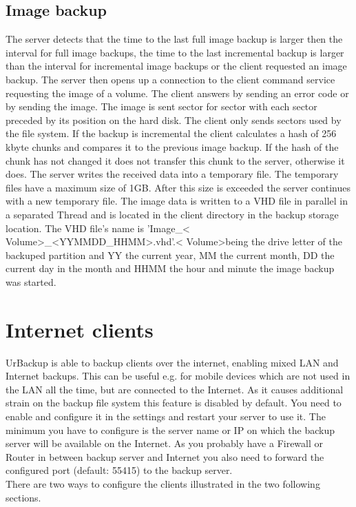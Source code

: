 \documentclass[a4paper,10pt]{article} \usepackage[breaklinks=true]{hyperref}
\begin{document}
\subsection{Image backup}

The server detects that the time to the last full image backup is larger then
the interval for full image backups, the time to the last incremental backup is
larger than the interval for incremental image backups or the client requested
an image backup. The server then opens up a connection to the client command
service requesting the image of a volume. The client answers by sending an error
code or by sending the image. The image is sent sector for sector with each
sector preceded by its position on the hard disk. The client only sends sectors
used by the file system. If the backup is incremental the client calculates a
hash of 256 kbyte chunks and compares it to the previous image backup. If the
hash of the chunk has not changed it does not transfer this chunk to the server,
otherwise it does. The server writes the received data into a temporary file.
The temporary files have a maximum size of 1GB. After this size is exceeded the
server continues with a new temporary file. The image data is written to a VHD
file in parallel in a separated Thread and is located in the client directory in
the backup storage location. The VHD file's name is 'Image\_\textless
Volume\textgreater\_\textless YYMMDD\_HHMM\textgreater.vhd'.\textless
Volume\textgreater  being the drive letter of the backuped partition and YY the
current year, MM the current month, DD the current day in the month and HHMM the
hour and minute the image backup was started.

\section{Internet clients}
\label{sec:internet_clients}

UrBackup is able to backup clients over the internet, enabling mixed LAN and
Internet backups. This can be useful e.g. for mobile devices which are not
used in the LAN all the time, but are connected to the Internet. As it causes
additional strain on the backup file system this feature is disabled by default.
You need to enable and configure it in the settings and restart your server to
use it. The minimum you have to configure is the server name or IP on which
the backup server will be available on the Internet. As you probably have a
Firewall or Router in between backup server and Internet you also need to forward
the configured port (default: 55415) to the backup server.\\
There are two ways to configure the clients illustrated in the two following sections.
\end{document}
